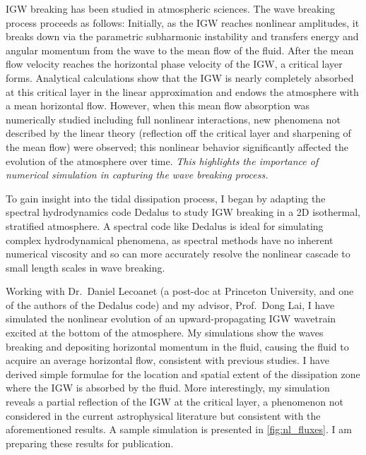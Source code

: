 \documentclass[12pt,
        usenames, %
        dvipsnames %
    ]{article}
\begin{document}
IGW breaking has been studied in atmospheric sciences. The wave
breaking process proceeds as follows: Initially, as the IGW reaches nonlinear
amplitudes, it breaks down via the parametric subharmonic instability and
transfers energy and angular momentum from the wave to the mean flow of the
fluid\cite{drazin}. After the mean flow velocity reaches the
horizontal phase velocity of the IGW, a critical layer forms. Analytical
calculations show that the IGW is nearly completely absorbed at this critical
layer in the linear approximation and endows the atmosphere with a mean
horizontal flow\cite{booker_bretherton,hazel}. However, when this mean flow
absorption was numerically studied including full nonlinear interactions, new
phenomena not described by the linear theory (reflection off the critical layer
and sharpening of the mean flow) were observed\cite{jones_num,winters1994}; this
nonlinear behavior significantly affected the evolution of the atmosphere over
time. \emph{This highlights the importance of numerical simulation in capturing
the wave breaking process.}

To gain insight into the tidal dissipation process, I began by adapting the
spectral hydrodynamics code Dedalus\cite{dedalus} to study IGW breaking in a 2D
isothermal, stratified atmosphere. A spectral code like Dedalus is ideal for
simulating complex hydrodynamical phenomena, as spectral methods have no
inherent numerical viscosity and so can more accurately resolve the nonlinear
cascade to small length scales in wave breaking.

Working with Dr.\ Daniel Lecoanet (a post-doc at Princeton University, and one
of the authors of the Dedalus code) and my advisor, Prof.\ Dong Lai, I have
simulated the nonlinear evolution of an upward-propagating IGW wavetrain excited
at the bottom of the atmosphere. My simulations show the waves breaking and
depositing horizontal momentum in the fluid, causing the fluid to acquire an
average horizontal flow, consistent with previous studies\cite{fullerII}. I have
derived simple formulae for the location and spatial extent of the dissipation
zone where the IGW is absorbed by the fluid. More interestingly, my simulation
reveals a partial reflection of the IGW at the critical layer\cite{me}, a
phenomenon not considered in the current astrophysical literature but consistent
with the aforementioned results\cite{winters1994}. A sample simulation is
presented in \autoref{fig:nl_fluxes}. I am preparing these results for
publication\cite{me}.
\end{document}
